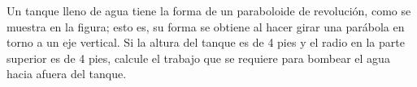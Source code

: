 \item Un tanque lleno de agua tiene la forma de un paraboloide de revolución, como se muestra en la figura; esto es, su forma se obtiene al hacer girar una parábola en torno a un eje vertical. Si la altura del tanque es de 4 pies y el radio en la parte superior es de 4 pies, calcule el trabajo que se requiere para bombear el agua hacia afuera del tanque.
\begin{center}
\end{center}
